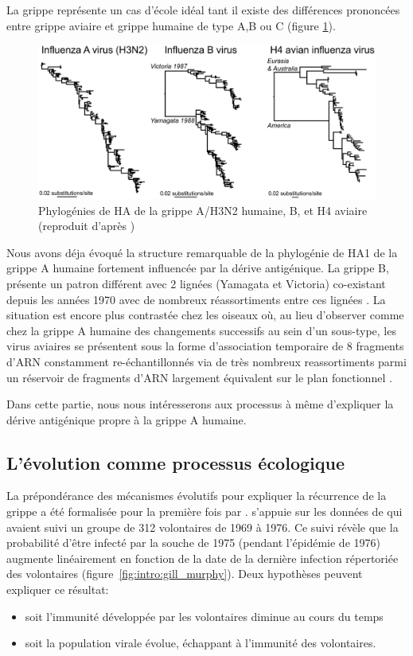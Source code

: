 La grippe représente un cas d'école idéal tant il existe des
différences prononcées entre grippe aviaire et grippe humaine de type
A,B ou C (figure \ref{fig:intro:holmes}).

\begin{figure}[!htbp]
  \begin{center}
    \includegraphics[width=0.8\linewidth]{graphs/intro/flu_holmes.eps}
  \end{center}
  \caption{Phylogénies de HA de la grippe A/H3N2 humaine, B, et H4
    aviaire (reproduit d'après \citet{Holmes2009})}
  \label{fig:intro:holmes}
\end{figure}

Nous avons déja évoqué la structure remarquable de la phylogénie de
HA1 de la grippe A humaine fortement influencée par la dérive
antigénique. La grippe B, présente un patron différent avec 2 lignées
(Yamagata et Victoria) co-existant depuis les années 1970
\citep{Hay2001} avec de nombreux réassortiments entre ces lignées
\citep{Lin2004}.  La situation est encore plus contrastée chez les
oiseaux où, au lieu d'observer comme chez la grippe A humaine des
changements successifs au sein d'un sous-type, les virus aviaires se
présentent sous la forme d'association temporaire de 8 fragments d'ARN
constamment re-échantillonnés via de très nombreux reassortiments parmi
un réservoir de fragments d'ARN largement équivalent sur le plan
fonctionnel \citep{Dugan2008}.

Dans cette partie, nous nous intéresserons aux processus à même
d'expliquer la dérive antigénique propre à la grippe A humaine.

\subsection{L'évolution comme processus écologique}

La prépondérance des mécanismes évolutifs pour expliquer la récurrence
de la grippe a été formalisée pour la première fois par
\citet{Pease1987}. \citet{Pease1987} s'appuie sur les données de
\citet{Gill1977} qui avaient suivi un groupe de 312 volontaires de
1969 à 1976. Ce suivi révèle que la probabilité d'être infecté par la
souche de 1975 (pendant l'épidémie de 1976) augmente linéairement en
fonction de la date de la dernière infection répertoriée des
volontaires (figure~\ref{fig:intro:gill_murphy}). Deux hypothèses
peuvent expliquer ce résultat:
\begin{itemize}
\item soit l'immunité développée par les volontaires diminue au cours
  du temps
\item soit la population virale évolue, échappant à l'immunité des
  volontaires.
\end{itemize}


